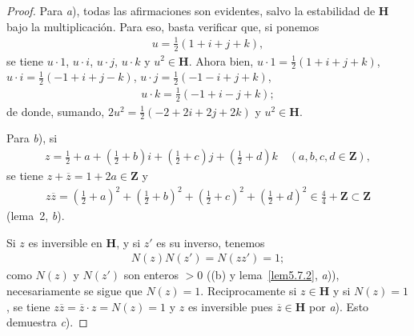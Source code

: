\documentclass[10pt,oneside,bibtotoc,smallheadings,leqno,a5paper,DIV=12]{scrbook}
\newcommand{\ZZ}{\mathbf{Z}}
\newcommand{\HH}{\mathbf{H}}
\newcommand{\oline}[1]{\overline{#1}}
\numberwithin{equation}{section}
\theoremstyle{defi}
\theoremstyle{enonce}
\theoremstyle{rem}
\numberwithin{theorem}{section}
\numberwithin{proposition}{section}
\numberwithin{definition}{section}
\numberwithin{lemma}{section}
\numberwithin{corollary}{section}
\numberwithin{example}{section}
\numberwithin{footnote}{section}%
\begin{document}
\begin{proof}
Para {\itshape a}), todas las afirmaciones son evidentes, salvo la estabilidad de $\HH$ bajo la multiplicaci\'on.
Para eso, basta verificar que, si ponemos
\begin{gather*}
u = \frac{1}{2}(1+i+j+k),
\end{gather*}
se tiene $u\cdot 1$, $u\cdot i$, $u\cdot j$, $u\cdot k$ y $u^{2}\in\HH$. Ahora bien,
$u\cdot 1 = \frac{1}{2}(1+i+j+k)$, $u\cdot i = \frac{1}{2}(-1+i+j-k)$, $u\cdot j=\frac{1}{2}(-1-i+j+k)$,
\begin{gather*}
u\cdot k = \frac{1}{2}(-1+i-j+k);
\end{gather*}
de donde, sumando, $2u^{2}=\frac{1}{2}(-2+2i+2j+2k)$ y $u^{2}\in\HH$.

Para {\itshape b}), si
\begin{gather*}
z = \frac{1}{2}+a+\left(\frac{1}{2}+b\right)i+\left(\frac{1}{2}+c\right)j+\left(\frac{1}{2}+d\right)k
\quad(a,b,c,d\in\ZZ),
\end{gather*}
se tiene $z+\oline z = 1+2a\in\ZZ$ y
\begin{gather*}
z\oline z = \left(\frac{1}{2}+a\right)^{2}+\left(\frac{1}{2}+b\right)^{2}+\left(\frac{1}{2}+c\right)^{2}
+\left(\frac{1}{2}+d\right)^{2}\in\frac{4}{4}+\ZZ\subset\ZZ
\end{gather*}
(lema~2, {\itshape b}).

Si $z$ es inversible en $\HH$, y si $z'$ es su inverso, tenemos
\begin{gather*}
N(z)N(z') = N(zz') = 1;
\end{gather*}
como $N(z)$ y $N(z')$ son enteros $>0$ ((b) y
lema~\ref{lem5.7.2}, {\itshape a})), necesariamente se sigue que
$N(z) = 1$. Reciprocamente si $z\in\HH$ y si $N(z) = 1$, se tiene
$z\oline z = \oline z\cdot z = N(z) = 1$
y $z$ es inversible pues $\oline z\in\HH$ por {\itshape a}). Esto demuestra {\itshape c}).


\end{proof}
\end{document}
